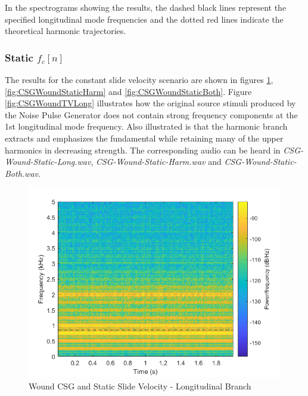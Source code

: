 \documentclass[../main.tex]{subfiles}
\begin{document}
In the spectrograms showing the results, the dashed black lines represent the specified longitudinal mode frequencies and the dotted red lines indicate the theoretical harmonic trajectories.

\subsubsection{Static $f_c[n]$}
The results for the constant slide velocity scenario are shown in figures \ref{fig:CSGWoundStaticLong}, \ref{fig:CSGWoundStaticHarm} and \ref{fig:CSGWoundStaticBoth}. Figure \ref{fig:CSGWoundTVLong} illustrates how the original source stimuli produced by the Noise Pulse Generator does not contain strong frequency components at the 1st longitudinal mode frequency. Also illustrated is that the harmonic branch extracts and emphasizes the fundamental while retaining many of the upper harmonics in decreasing strength. The corresponding audio can be heard in \emph{CSG-Wound-Static-Long.wav}, \emph{CSG-Wound-Static-Harm.wav} and \emph{CSG-Wound-Static-Both.wav}.

\begin{figure}[h]
    \centering
    \includegraphics[scale=.65]{./images/plots/CSG_Wound_Static_Long.png}
    \caption{Wound CSG and Static Slide Velocity - Longitudinal Branch}
    \label{fig:CSGWoundStaticLong}
\end{figure}
\end{document}
